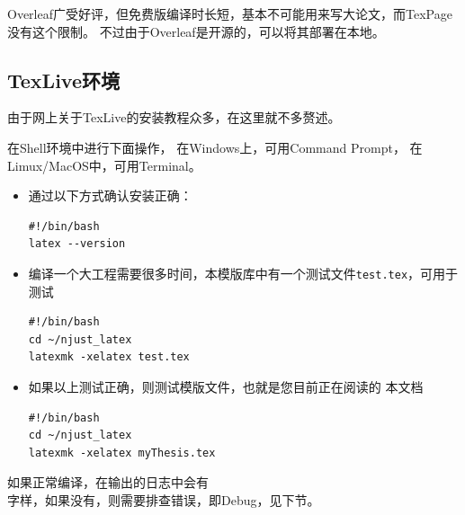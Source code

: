 Overleaf广受好评，但免费版编译时长短，基本不可能用来写大论文，而TexPage没有这个限制。
不过由于Overleaf是开源的，可以将其部署在本地。


\subsection{TexLive环境}

由于网上关于TexLive的安装教程众多，在这里就不多赘述。

在Shell\footnotemark 环境中进行下面操作，
在Windows上，可用Command Prompt，
在Limux/MacOS中，可用Terminal。


\begin{itemize}
    \item 通过以下方式确认安装正确：

\begin{lstlisting}[style=myshell,caption=系统管理脚本]
#!/bin/bash
latex --version
\end{lstlisting}

    \item 编译一个大工程需要很多时间，本模版库中有一个测试文件\texttt{test.tex}，可用于测试
    
\begin{lstlisting}[style=myshell,caption=基本测试]
#!/bin/bash
cd ~/njust_latex
latexmk -xelatex test.tex
\end{lstlisting}

    \item 如果以上测试正确，则测试模版文件，也就是您目前正在阅读的
    本文档

\begin{lstlisting}[style=myshell, caption=模版测试, label=code:compile]
#!/bin/bash
cd ~/njust_latex
latexmk -xelatex myThesis.tex
\end{lstlisting}

\end{itemize}

如果正常编译，在输出的日志中会有
\\ 
字样，如果没有，则需要排查错误，即Debug，见下节。

